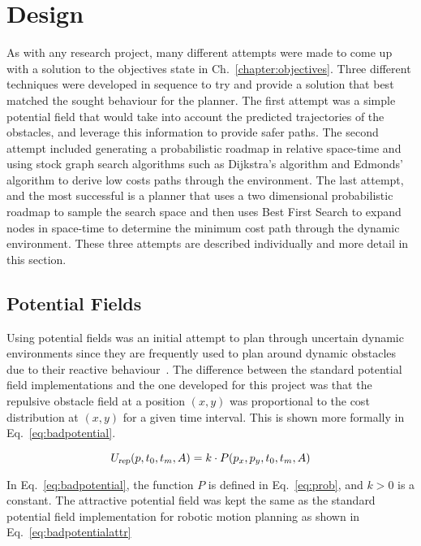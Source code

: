 


\chapter{Design}

\label{chapter:design}

As with any research project, many different attempts were made to come up with
a solution to the objectives state in Ch.~\ref{chapter:objectives}. Three
different techniques were developed in sequence to try and provide a solution
that best matched the sought behaviour for the planner. The first attempt was a
simple potential field that would take into account the predicted trajectories
of the obstacles, and leverage this information to provide safer paths. The
second attempt included generating a probabilistic roadmap in relative
space-time and using stock graph search algorithms such as Dijkstra's algorithm
and Edmonds' algorithm to derive low costs paths through the environment. The
last attempt, and the most successful is a planner that uses a two dimensional
probabilistic roadmap to sample the search space and then uses Best First
Search to expand nodes in space-time to determine the minimum cost path through
the dynamic environment. These three attempts are described individually and
more detail in this section.

\section{Potential Fields}

Using potential fields was an initial attempt to plan through uncertain dynamic
environments since they are frequently used to plan around dynamic obstacles
due to their reactive behaviour~\cite{pf, wallar_taros_2013,
wallar_ssci_2014_boids}.  The difference between the standard potential field
implementations and the one developed for this project was that the repulsive
obstacle field at a position $(x, y)$ was proportional to the cost distribution
at $(x, y)$ for a given time interval.  This is shown more formally in
Eq.~\ref{eq:badpotential}.

\begin{equation}
    U_{\Var{rep}}(p, t_0, t_m, A) = k \cdot P(p_x, p_y, t_0, t_m, A)
    \label{eq:badpotential}
\end{equation}

In Eq.~\ref{eq:badpotential}, the function $P$ is defined in Eq.~\ref{eq:prob},
and $k > 0$ is a constant.  The attractive potential field was kept the same as
the standard potential field implementation for robotic motion planning as
shown in Eq.~\ref{eq:badpotentialattr}

